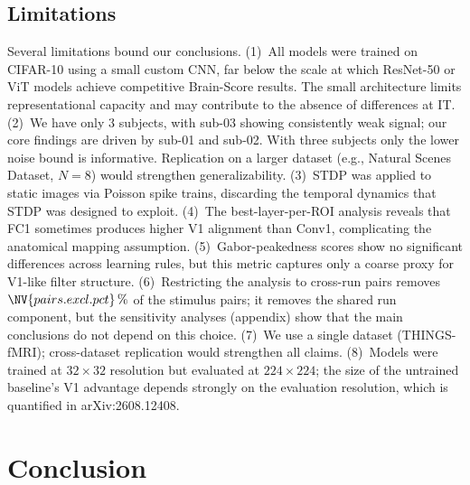 \documentclass[10pt,twocolumn]{article}
\newcommand{\newid}{arXiv:2608.12408}
\begin{document}
\subsection{Limitations}

Several limitations bound our conclusions. (1)~All models were trained on CIFAR-10 using a small custom CNN, far below the scale at which ResNet-50 or ViT models achieve competitive Brain-Score results. The small architecture limits representational capacity and may contribute to the absence of differences at IT. (2)~We have only 3 subjects, with sub-03 showing consistently weak signal; our core findings are driven by sub-01 and sub-02. With three subjects only the lower noise bound is informative. Replication on a larger dataset (e.g., Natural Scenes Dataset, $N = 8$) would strengthen generalizability. (3)~STDP was applied to static images via Poisson spike trains, discarding the temporal dynamics that STDP was designed to exploit. (4)~The best-layer-per-ROI analysis reveals that FC1 sometimes produces higher V1 alignment than Conv1, complicating the anatomical mapping assumption. (5)~Gabor-peakedness scores show no significant differences across learning rules, but this metric captures only a coarse proxy for V1-like filter structure. (6)~Restricting the analysis to cross-run pairs removes $\NV{pairs.excl.pct}\,\%$ of the stimulus pairs; it removes the shared run component, but the sensitivity analyses (appendix) show that the main conclusions do not depend on this choice. (7)~We use a single dataset (THINGS-fMRI); cross-dataset replication would strengthen all claims. (8)~Models were trained at $32\times32$ resolution but evaluated at $224\times224$; the size of the untrained baseline's V1 advantage depends strongly on the evaluation resolution, which is quantified in \newid.

\section{Conclusion}
\end{document}
